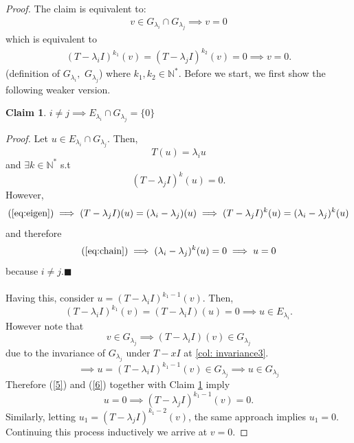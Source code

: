 \documentclass{article}
\theoremstyle{definition}
\newtheorem{claim}[theorem]{Claim}
\newcommand{\id}{I}
\begin{document}
\begin{proof} The claim is equivalent to:  
\begin{align}
v\in G_{\lambda_i}\cap G_{\lambda_j}
\implies v=0 
\end{align}
which is equivalent to
\begin{align}
(T-\lambda_i I)^{k_1}(v)=(T-\lambda_j I)^{k_2}(v)=0\implies v=0.
\end{align}
(definition of $G_{\lambda_i},$ $G_{\lambda_j}$) where $k_1,k_2\in \mathbb{N^*}.$
Before we start, we first show the following weaker version.

\begin{claim}\label{cl:disj}
    $i\neq j \implies E_{\lambda_i}\cap G_{\lambda_j}=\{0\}$
\end{claim}

\textit{Proof.}
    Let $u\in E_{\lambda_i}\cap G_{\lambda_j}$. Then, \begin{equation}
    \label{eq:eigen}
    T(u)=\lambda_i u
\end{equation} and $\exists k\in \mathbb{N}^*$ s.t
\begin{equation}
\label{eq:chain}
    (T-\lambda_j\id)^k(u)=0.
\end{equation}
However,
$$(\ref{eq:eigen})\implies (T-\lambda_j\id)(u)=(\lambda_i - \lambda_j)(u)\implies(T-\lambda_j\id)^k(u)=(\lambda_i-\lambda_j)^k(u) $$and therefore $$(\ref{eq:chain})\implies (\lambda_i-\lambda_j)^k(u)=0\implies u=0$$because $i\neq j$.\hfill $\blacksquare$ \\ \\
Having this, consider $u=(T-\lambda_i\id)^{k_1-1}(v)$. Then,
\begin{equation}\label{5}
(T-\lambda_i\id)^{k_1}(v)=(T-\lambda_i\id)(u)=0\implies u\in E_{\lambda_i}.
\end{equation}
However note that $$v\in G_{\lambda_j}\implies (T-\lambda_i\id)(v)\in G_{\lambda_j}$$due to the invariance of $G_{\lambda_j}$ under $T-xI$ at \ref{col: invariance3}.
\begin{equation}\label{6}
    \implies u=(T-\lambda_i\id)^{k_1-1}(v)\in G_{\lambda_j}\implies u\in G_{\lambda_j} 
\end{equation}
Therefore (\ref{5}) and (\ref{6}) together with Claim \ref{cl:disj} imply $$u=0\implies (T-\lambda_j\id)^{k_1-1}(v)=0.$$
Similarly, letting $u_1=(T-\lambda_j\id)^{k_1-2}(v)$, the same approach implies $u_1=0$. Continuing this process inductively we arrive at $v=0.$



\end{proof}
\end{document}
